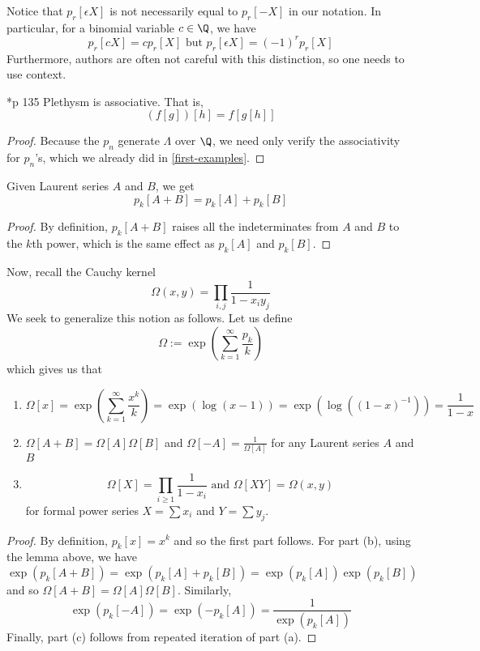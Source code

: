 \documentclass[11pt,leqno,oneside]{amsart}
\numberwithin{thm}{section}
\newcommand{\sym}{\Lambda}
\begin{document}
\begin{rmk}
  Notice that \(p_r[\epsilon X]\) is not necessarily equal to
  \(p_r[-X]\) in our notation. In particular, for a binomial variable
  \(c \in \Q\), we have \[
    p_r[cX] = cp_r[X] \text{ but } p_r[\epsilon X] = (-1)^r p_r[X]
  \]
  Furthermore, authors are often not careful with this distinction, so
  one needs to use context. 
\end{rmk}
\begin{prop}
  \cite{macdonald}*{p 135} Plethysm is associative. That is, \[
   (f[g])[h] = f[g[h]]
  \]
\end{prop}
\begin{proof}
  Because the \(p_n\) generate \(\sym\) over \(\Q\), we need only
  verify the associativity for \(p_n\)'s, which we already did in
  \ref{first-examples}. 
\end{proof}
\begin{lem}
  Given Laurent series \(A\) and \(B\), we get \[
    p_k[A+B] = p_k[A]+p_k[B]
  \]
\end{lem}
\begin{proof}
  By definition, \(p_k[A+B]\) raises all the indeterminates from \(A\)
  and \(B\) to the \(k\)th power, which is the same effect as
  \(p_k[A]\) and \(p_k[B]\).
\end{proof}
Now, recall the Cauchy kernel \[
  \Omega(x,y) = \prod_{i,j} \frac{1}{1-x_i y_j}
\]
We seek to generalize this notion as follows. Let us define \[
  \Omega := \exp\left( \sum_{k=1}^\infty \frac{p_k}{k} \right) 
\]
which gives us that
\begin{prop}
  \begin{enumerate}
  \item \[
  \Omega[x] = \exp\left( \sum_{k=1}^\infty \frac{x^k}{k} \right) =
  \exp\left( \log(x-1) \right) = \exp\left( \log((1-x)^{-1}) \right) = \frac{1}{1-x}
\]
  \item \(\Omega[A+B] = \Omega[A]\Omega[B]\) and \(\Omega[-A] =
    \frac{1}{\Omega[A]}\) for any Laurent series \(A\) and \(B\)
  \item \[
  \Omega[X] = \prod_{i \geq 1} \frac{1}{1-x_i} \text{ and } \Omega[XY]
  = \Omega(x,y)
\]
for formal power series \(X = \sum x_i\) and \(Y = \sum y_j\). 
  \end{enumerate}
\end{prop}
\begin{proof}
  By definition, \(p_k[x] = x^k\) and so the first part follows. For
  part (b), using the lemma above, we have \[
    \exp\left( p_k[A+B] \right) = \exp\left(
      p_k[A]+p_k[B] \right) = \exp\left(p_k[A]
    \right)\exp \left(p_k[B] \right) 
  \]
  and so \(\Omega[A+B] = \Omega[A]\Omega[B]\). Similarly, \[
    \exp\left( p_k[-A] \right) = \exp\left( -p_k[A] \right) =
    \frac{1}{\exp\left( p_k[A] \right)} 
  \]
  Finally, part (c) follows from repeated iteration of part (a).
\end{proof}
\end{document}
